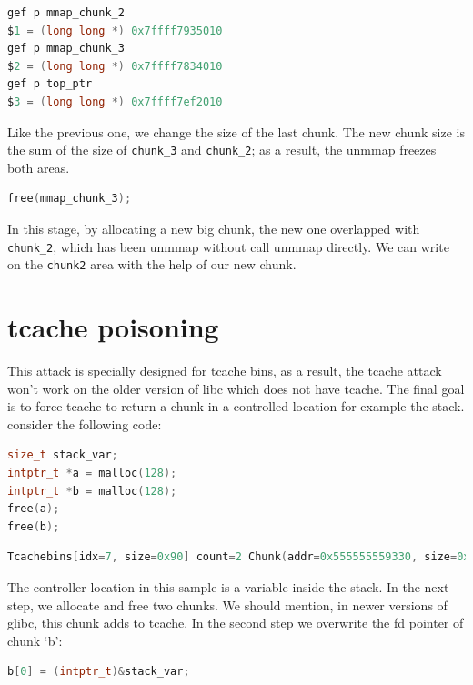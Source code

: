 \documentclass{masterthesis}
\newcommand*\libc{glibc}
\newcommand*\tch{tcache}
\begin{document}
\begin{lstlisting}[language=c,frame=tlrb]
gef p mmap_chunk_2
$1 = (long long *) 0x7ffff7935010
gef p mmap_chunk_3
$2 = (long long *) 0x7ffff7834010
gef p top_ptr
$3 = (long long *) 0x7ffff7ef2010
\end{lstlisting}

Like the previous one, we change the size of the last chunk. The new chunk size is the sum of the size of \lstinline{chunk_3} and \lstinline{chunk_2}; as a result, the unmmap freezes both areas.

\begin{lstlisting}[language=c,frame=tlrb]
free(mmap_chunk_3);
\end{lstlisting}

In this stage, by allocating a new big chunk, the new one overlapped with \lstinline{chunk_2}, which has been unmmap without call unmmap directly. We can write on the \lstinline{chunk2} area with the help of our new chunk.

\section{\tch{} poisoning}
This attack is specially designed for \tch{} bins, as a result, the \tch{} attack won't work on the older version of libc which does not have \tch{}. The final goal is to force \tch{} to return a chunk in a controlled location for example the stack. consider the following code:

\begin{lstlisting}[language=c,frame=tlrb]
size_t stack_var;
intptr_t *a = malloc(128);
intptr_t *b = malloc(128);
free(a);
free(b);
\end{lstlisting}

\begin{lstlisting}[language=c,frame=tlrb]
Tcachebins[idx=7, size=0x90] count=2 Chunk(addr=0x555555559330, size=0x90, flags=PREV_INUSE) Chunk(addr=0x5555555592a0, size=0x90, flags=PREV_INUSE)
\end{lstlisting}

The controller location in this sample is a variable inside the stack. In the next step, we allocate and free two chunks. We should mention, in newer versions of \libc{}, this chunk adds to \tch{}.
In the second step we overwrite the fd pointer of chunk ‘b’:

\begin{lstlisting}[language=c,frame=tlrb]
b[0] = (intptr_t)&stack_var;
\end{lstlisting}
\end{document}
